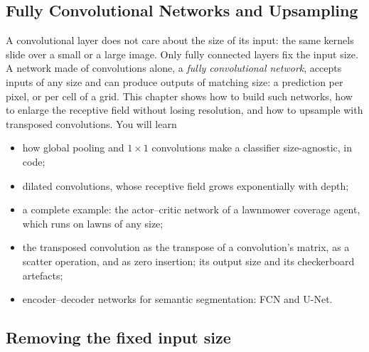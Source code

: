 \begin{notechapter}
\chapter{Fully Convolutional Networks and Upsampling}\label{ch:fully-convolutional}

\begin{chapterintro}
A convolutional layer does not care about the size of its input: the same kernels slide over
a small or a large image. Only fully connected layers fix the input size. A network made of
convolutions alone, a \emph{fully convolutional network}, accepts inputs of any size and can
produce outputs of matching size: a prediction per pixel, or per cell of a grid. This
chapter shows how to build such networks, how to enlarge the receptive field without
losing resolution, and how to upsample with transposed convolutions. You will learn
\begin{itemize}[nosep]
  \item how global pooling and $1\times1$ convolutions make a classifier size-agnostic, in code;
  \item dilated convolutions, whose receptive field grows exponentially with depth;
  \item a complete example: the actor--critic network of a lawnmower coverage agent, which
        runs on lawns of any size;
  \item the transposed convolution as the transpose of a convolution's matrix, as a scatter
        operation, and as zero insertion; its output size and its checkerboard artefacts;
  \item encoder--decoder networks for semantic segmentation: FCN and U-Net.
\end{itemize}
\end{chapterintro}

\section{Removing the fixed input size}\label{fully-convolutional:sec:anysize}


\end{notechapter}
